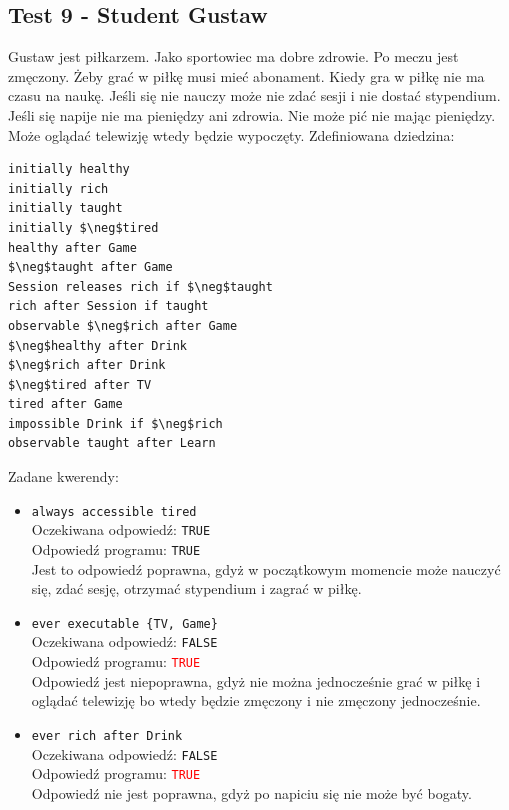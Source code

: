 \documentclass{article}
\begin{document}
\subsection{Test 9 - Student Gustaw}
Gustaw jest piłkarzem. Jako sportowiec ma dobre zdrowie. Po meczu jest zmęczony. Żeby grać w piłkę musi mieć abonament. Kiedy gra w piłkę nie ma czasu na naukę. Jeśli się nie nauczy może nie zdać sesji i nie dostać stypendium. Jeśli się napije nie ma pieniędzy ani zdrowia. Nie może pić nie mając pieniędzy. Może oglądać telewizję wtedy będzie wypoczęty.
Zdefiniowana dziedzina:
\begin{lstlisting}[mathescape=true]
initially healthy
initially rich
initially taught
initially $\neg$tired
healthy after Game
$\neg$taught after Game
Session releases rich if $\neg$taught
rich after Session if taught
observable $\neg$rich after Game
$\neg$healthy after Drink
$\neg$rich after Drink
$\neg$tired after TV
tired after Game
impossible Drink if $\neg$rich
observable taught after Learn
\end{lstlisting}
Zadane kwerendy:
\begin{itemize}
    \item {\large\texttt{always accessible tired}}\\
	Oczekiwana odpowiedź: \texttt{TRUE}\\
    Odpowiedź programu: \texttt{TRUE}\\
    Jest to odpowiedź poprawna, gdyż w początkowym momencie może nauczyć się, zdać sesję, otrzymać stypendium i zagrać w piłkę.

    \item {\large\texttt{ever executable \{TV, Game\}}}\\
	Oczekiwana odpowiedź: \texttt{FALSE}\\
    Odpowiedź programu: \textcolor{red}{\texttt{TRUE}}\\
    Odpowiedź jest niepoprawna, gdyż nie można jednocześnie grać w piłkę i oglądać telewizję bo wtedy będzie zmęczony i nie zmęczony jednocześnie.

	\item {\large\texttt{ever rich after Drink}}\\
	Oczekiwana odpowiedź: \texttt{FALSE}\\
	Odpowiedź programu: \textcolor{red}{\texttt{TRUE}}\\
    Odpowiedź nie jest poprawna, gdyż po napiciu się nie może być bogaty.

\end{itemize}
\newpage
\end{document}
